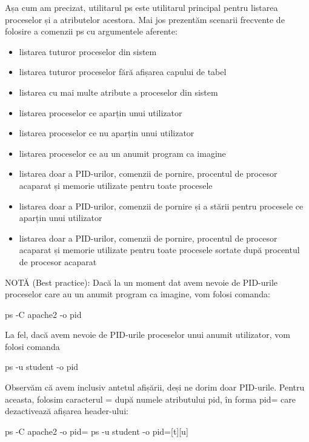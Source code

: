 Așa cum am precizat, utilitarul ps este utilitarul principal pentru listarea
proceselor și a atributelor acestora. Mai jos prezentăm scenarii frecvente de
folosire a comenzii ps cu argumentele aferente:

\begin{itemize}
	\item listarea tuturor proceselor din sistem
	\item listarea tuturor proceselor fără afișarea capului de tabel
	\item listarea cu mai multe atribute a proceselor din sistem
	\item listarea proceselor ce aparțin unui utilizator
	\item listarea proceselor ce nu aparțin unui utilizator
	\item listarea proceselor ce au un anumit program ca imagine
	\item listarea doar a PID-urilor, comenzii de pornire, procentul de
		procesor acaparat și memorie utilizate pentru toate procesele
	\item listarea doar a PID-urilor, comenzii de pornire și a stării pentru
		procesele ce aparțin unui utilizator
	\item listarea  doar a PID-urilor, comenzii de pornire, procentul de
		procesor acaparat și memorie utilizate pentru toate procesele
		sortate după procentul de procesor acaparat
\end{itemize}

NOTĂ (Best practice): Dacă la un moment dat avem nevoie de PID-urile proceselor
care au un anumit program ca imagine, vom folosi comanda:

\begin{screen}
ps -C apache2 -o pid
\end{screen}

La fel, dacă avem nevoie de PID-urile proceselor unui anumit utilizator, vom
folosi comanda

\begin{screen}
ps -u student -o pid
\end{screen}

Observăm că avem inclusiv antetul afișării, deși ne dorim doar PID-urile. Pentru
aceasta, folosim caracterul = după numele atributului pid, în forma pid= care
dezactivează afișarea header-ului:

\begin{screen}
ps -C apache2 -o pid=
ps -u student -o pid=[t][u]
\end{screen}

